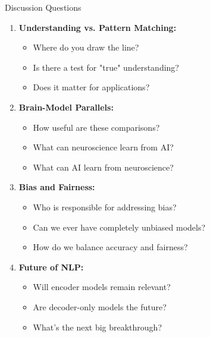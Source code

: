 \documentclass[aspectratio=169]{beamer}
\begin{document}
\begin{frame}[shrink=10]{Discussion Questions 💭}
\begin{enumerate}\setlength{\itemsep}{0pt}
    \item \textbf{Understanding vs. Pattern Matching:}
    \begin{itemize}\setlength{\itemsep}{0pt}
        \item Where do you draw the line?
        \item Is there a test for "true" understanding?
        \item Does it matter for applications?
    \end{itemize}

    \vspace{0.5em}

    \item \textbf{Brain-Model Parallels:}
    \begin{itemize}\setlength{\itemsep}{0pt}
        \item How useful are these comparisons?
        \item What can neuroscience learn from AI?
        \item What can AI learn from neuroscience?
    \end{itemize}

    \vspace{0.5em}

    \item \textbf{Bias and Fairness:}
    \begin{itemize}\setlength{\itemsep}{0pt}
        \item Who is responsible for addressing bias?
        \item Can we ever have completely unbiased models?
        \item How do we balance accuracy and fairness?
    \end{itemize}

    \vspace{0.5em}

    \item \textbf{Future of NLP:}
    \begin{itemize}\setlength{\itemsep}{0pt}
        \item Will encoder models remain relevant?
        \item Are decoder-only models the future?
        \item What's the next big breakthrough?
    \end{itemize}
\end{enumerate}
\end{frame}
\end{document}
